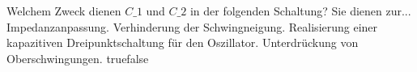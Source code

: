     {Welchem Zweck dienen $C\_1$ und $C\_2$ in der folgenden Schaltung? Sie dienen zur...}
    {Impedanzanpassung. }
    {Verhinderung der Schwingneigung.}
    {Realisierung einer kapazitiven Dreipunktschaltung für den Oszillator.}
    {Unterdrückung von Oberschwingungen.}
    {true}{false}